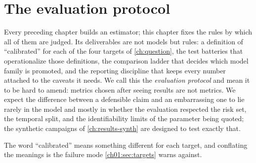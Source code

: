 
\section{The evaluation protocol}\label{ch07:sec:constitution}

Every preceding chapter builds an estimator; this chapter fixes the rules
by which all of them are judged. Its deliverables are not models but rules:
a definition of ``calibrated'' for each of the four targets of
\cref{ch:question}, the test batteries that operationalize those
definitions, the comparison ladder that decides which model family is
promoted, and the reporting discipline that keeps every number attached to
the caveats it needs. We call this the \emph{evaluation protocol} and mean
it to be hard to amend: metrics chosen after seeing results are not
metrics. We expect the difference between a defensible claim and an
embarrassing one to lie rarely in the model and mostly in whether the
evaluation respected the risk set, the temporal split, and the
identifiability limits of the parameter being quoted; the synthetic
campaigns of \cref{ch:results-synth} are designed to test exactly that.

The word ``calibrated'' means something different for each target, and
conflating the meanings is the failure mode
\cref{ch01:sec:targets} warns against.

